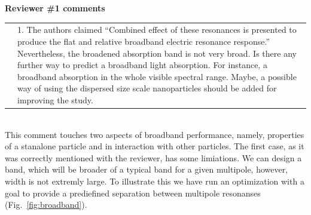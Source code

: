 \documentclass[a4paper]{article}
\begin{document}
\vspace{10pt}

\textbf{Reviewer \#1 comments}

\begin{tabular}[!H]{l|p{}}
\quad & 1. The authors claimed “Combined effect of these resonances is presented to produce the flat and relative broadband electric resonance response.” Nevertheless, the broadened absorption band is not very broad. Is there any further way to predict a broadband light absorption. For instance, a broadband absorption in the whole visible spectral range. Maybe, a possible way of using the dispersed size scale nanoparticles should be added for improving the study. 
\end{tabular}\\

This comment touches two aspects of broadband performance, namely,
properties of a stanalone particle and in interaction with other
particles.  The first case, as it was correctly mentioned with the
reviewer, has some limiations.  We can design a band, which will be
broader of a typical band for a given multipole, however, width is
not extremly large.  To illustrate this we have run an optimization
with a goal to provide a prediefined separation between multipole
resonanses (Fig.~\ref{fig:broadband}).
\end{document}

